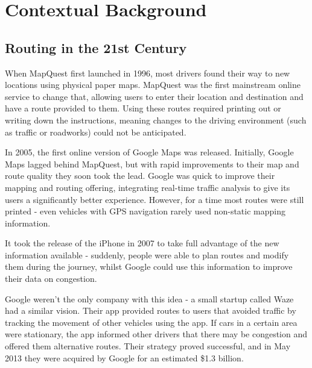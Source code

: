 \documentclass[ %
                    author={Alexander Hill},
                supervisor={Dr. Benjamin Sach},
                    degree={MEng},
                     title={MARMOSET},
                  subtitle={Multi-Agent Route Management using Online Simulation for Efficient Transportation},
                      type={research},
                      year={2016} ]{dissertation}
\begin{document}
\mainmatter


\chapter{Contextual Background}
\label{chap:context}

\vspace{1cm}

\noindent

\section{Routing in the 21st Century}

When MapQuest first launched in 1996, most drivers found their way to new
locations using physical paper maps. MapQuest was the first mainstream online
service to change that, allowing users to enter their location and destination
and have a route provided to them. Using these routes required printing out or
writing down the instructions, meaning changes to the driving environment (such
as traffic or roadworks) could not be anticipated.

In 2005, the first online version of Google Maps was released. Initially, Google
Maps lagged behind MapQuest, but with rapid improvements to their map and route
quality they soon took the lead. Google was quick to improve their mapping and
routing offering, integrating real-time traffic analysis to give its users a
significantly better experience. However, for a time most routes were still
printed - even vehicles with GPS navigation rarely used non-static mapping
information.

It took the release of the iPhone in 2007 to take full advantage of the new
information available - suddenly, people were able to plan routes and modify
them during the journey, whilst Google could use this information to improve
their data on congestion.

Google weren't the only company with this idea - a small startup called Waze had
a similar vision. Their app provided routes to users that avoided traffic by
tracking the movement of other vehicles using the app. If cars in a
certain area were stationary, the app informed other drivers that there may be
congestion and offered them alternative routes. Their strategy proved
successful, and in May 2013 they were acquired by Google for an estimated \$1.3
billion.
\end{document}
